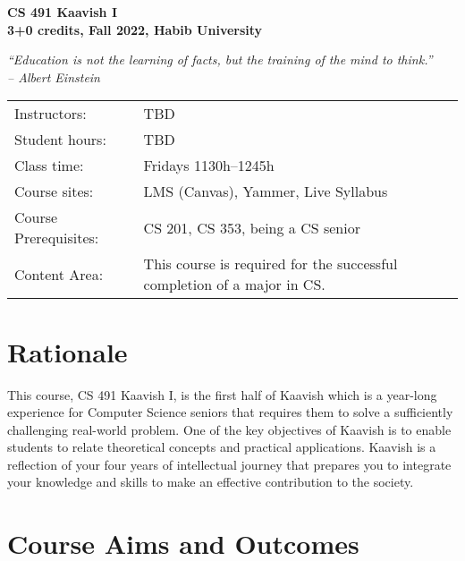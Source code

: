 \documentclass[a4paper]{article}
\newcommand{\new}[1]{{#1}}
\begin{document}
\begin{center}
  {\bfseries {\huge CS 491 Kaavish I}\\\bigskip
    {\large 3+0 credits, Fall 2022, Habib University}}\\\medskip

\textit{``Education is not the learning of facts, but the training of the mind to think.''\\
  -- Albert Einstein}
\end{center}

\noindent
\begin{tabularx}{1.0\linewidth}{lX}
  Instructors: & TBD\\
  Student hours: & TBD\\
  Class time: & Fridays 1130h--1245h\\
  Course sites: & LMS (Canvas), Yammer, Live Syllabus\\
  Course Prerequisites: & CS 201, CS 353, being a CS senior\\
  Content Area: & This course is required for the successful completion of a major in CS.
\end{tabularx}
\medskip

\section{Rationale}
\new{This course, CS 491 Kaavish I, is the first half of Kaavish which is} a year-long experience for Computer Science seniors that requires them to solve a sufficiently challenging real-world problem. One of the key objectives of Kaavish is to enable students to relate theoretical concepts and practical applications. Kaavish is a reflection of your four years of intellectual journey that prepares you to integrate your knowledge and skills to make an effective contribution to the society.

\section{Course Aims and Outcomes}
\end{document}

